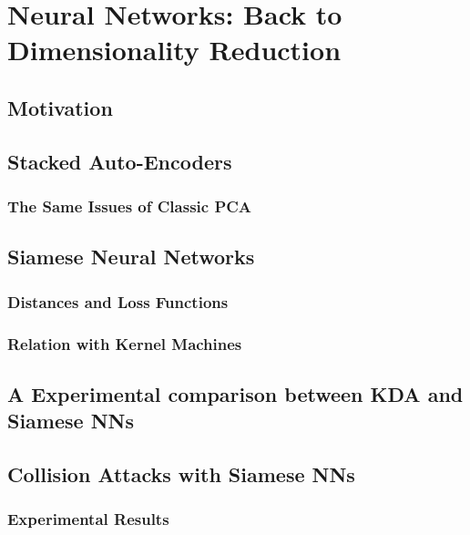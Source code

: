 
\chapter{Neural Networks: Back to Dimensionality Reduction} %

\label{ChapterNNforDimRed}


\section{Motivation}


\section{Stacked Auto-Encoders}
\subsection{The Same Issues of Classic PCA}

\section{Siamese Neural Networks}
\subsection{Distances and Loss Functions}
\subsection{Relation with Kernel Machines}


\section{A Experimental comparison between KDA and Siamese NNs}

\section{Collision Attacks with Siamese NNs}
\subsection{Experimental Results}
